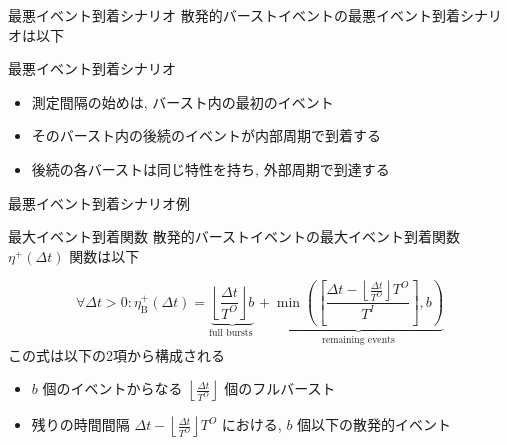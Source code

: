 \begin{frame}{最悪イベント到着シナリオ}
    散発的バーストイベントの最悪イベント到着シナリオは以下
    \begin{block}{最悪イベント到着シナリオ}
        \begin{itemize}
            \item 測定間隔の始めは, バースト内の最初のイベント
            \item そのバースト内の後続のイベントが内部周期で到着する
            \item 後続の各バーストは同じ特性を持ち, 外部周期で到達する
        \end{itemize}
    \end{block}
\end{frame}

\begin{frame}{最悪イベント到着シナリオ例}
\end{frame}

\begin{frame}{最大イベント到着関数}
    散発的バーストイベントの最大イベント到着関数 $\eta^{+}(\Delta t)$ 関数は以下

    \begin{equation*}
        \forall \Delta t>0: \eta_{\mathrm{B}}^{+}(\Delta t)=\underbrace{\left\lfloor\frac{\Delta t}{T^{O}}\right\rfloor b}_{\text {full bursts }}+\underbrace{\min \left(\left[\frac{\Delta t-\left\lfloor\frac{\Delta t}{T^{O}}\right\rfloor T^{O}}{T^{I}}\right], b\right)}_{\text {remaining events}}
    \end{equation*}
    この式は以下の2項から構成される
    \begin{itemize}
        \item $b$ 個のイベントからなる $\left\lfloor\frac{\Delta t}{T^{O}}\right\rfloor$ 個のフルバースト
        \item 残りの時間間隔 $\Delta t-\left\lfloor\frac{\Delta t}{T^{O}}\right\rfloor T^{O}$ における, $b$ 個以下の散発的イベント
    \end{itemize}
\end{frame}



